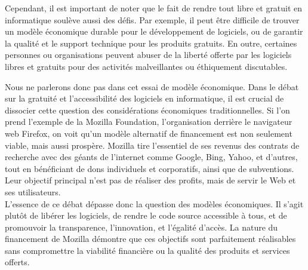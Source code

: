 

Cependant, il est important de noter que le fait de rendre tout libre et gratuit en informatique soulève aussi des défis. Par exemple, il peut être difficile de trouver un modèle économique durable pour le développement de logiciels, ou de garantir la qualité et le support technique pour les produits gratuits. En outre, certaines personnes ou organisations peuvent abuser de la liberté offerte par les logiciels libres et gratuits pour des activités malveillantes ou éthiquement discutables.

Nous ne parlerons donc pas dans cet essai de modèle économique. Dans le débat sur la gratuité et l'accessibilité des logiciels en informatique, il est crucial de dissocier cette question des considérations économiques traditionnelles. Si l'on prend l'exemple de la Mozilla Foundation, l'organisation derrière le navigateur web Firefox, on voit qu'un modèle alternatif de financement est non seulement viable, mais aussi prospère. Mozilla tire l'essentiel de ses revenus des contrats de recherche avec des géants de l'internet comme Google, Bing, Yahoo, et d'autres, tout en bénéficiant de dons individuels et corporatifs, ainsi que de subventions. Leur objectif principal n'est pas de réaliser des profits, mais de servir le Web et ses utilisateurs.\\

L'essence de ce débat dépasse donc la question des modèles économiques. Il s'agit plutôt de libérer les logiciels, de rendre le code source accessible à tous, et de promouvoir la transparence, l'innovation, et l'égalité d'accès. La nature du financement de Mozilla démontre que ces objectifs sont parfaitement réalisables sans compromettre la viabilité financière ou la qualité des produits et services offerts.

